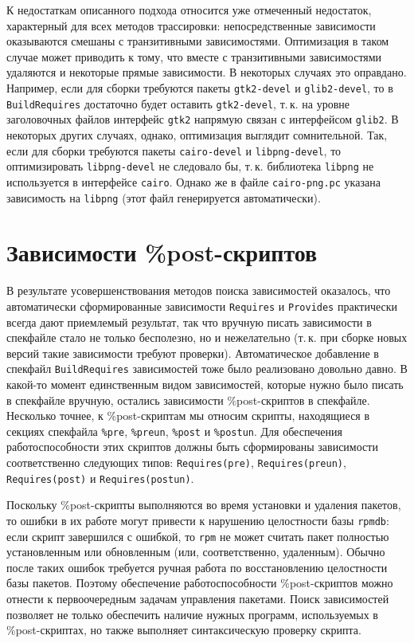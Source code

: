 \documentclass[russian,a4paper,12pt,titlepage]{article}
\begin{document}
К недостаткам описанного подхода относится уже отмеченный недостаток, характерный для всех методов трассировки:
непосредственные зависимости оказываются смешаны с транзитивными зависимостями.  Оптимизация в таком случае
может приводить к тому, что вместе с транзитивными зависимостями удаляются и некоторые прямые зависимости.
В некоторых случаях это оправдано.  Например, если для сборки требуются пакеты \verb|gtk2-devel| и
\verb|glib2-devel|, то в \verb|BuildRequires| достаточно будет оставить \verb|gtk2-devel|, т.\,к. на уровне
заголовочных файлов интерфейс \verb|gtk2| напрямую связан с интерфейсом \verb|glib2|.  В некоторых других случаях,
однако, оптимизация выглядит сомнительной.  Так, если для сборки требуются пакеты \verb|cairo-devel| и \verb|libpng-devel|,
то оптимизировать \verb|libpng-devel| не следовало бы, т.\,к. библиотека \verb|libpng| не используется в интерфейсе \verb|cairo|.
Однако же в файле \verb|cairo-png.pc| указана зависимость на \verb|libpng| (этот файл генерируется автоматически).

\section{Зависимости \%post-скриптов}
\label{post-script-deps}
В результате усовершенствования методов поиска зависимостей оказалось, что автоматически сформированные
зависимости \verb|Requires| и \verb|Provides| практически всегда дают приемлемый результат, так что вручную
писать зависимости в спекфайле стало не только бесполезно, но и нежелательно (т.\,к. при сборке новых версий
такие зависимости требуют проверки).  Автоматическое добавление в спекфайл \verb|BuildRequires| зависимостей
тоже было реализовано довольно давно.  В какой-то момент единственным видом зависимостей, которые нужно было
писать в спекфайле вручную, остались зависимости \%post-скриптов в спекфайле.  Несколько точнее, к \%post-скриптам
мы относим скрипты, находящиеся в секциях спекфайла \verb|%pre|, \verb|%preun|, \verb|%post| и \verb|%postun|.
Для обеспечения работоспособности этих скриптов должны быть сформированы зависимости соответственно следующих
типов: \verb|Requires(pre)|, \verb|Requires(preun)|, \verb|Requires(post)| и \verb|Requires(postun)|.

Поскольку \%post-скрипты выполняются во время установки и удаления пакетов, то ошибки в их работе
могут привести к нарушению целостности базы \verb|rpmdb|: если скрипт завершился с ошибкой, то
\verb|rpm| не может считать пакет полностью установленным или обновленным (или, соответственно, удаленным).
Обычно после таких ошибок требуется ручная работа по восстановлению целостности базы пакетов.
Поэтому обеспечение работоспособности \%post-скриптов можно отнести к первоочередным задачам управления пакетами.
Поиск зависимостей позволяет не только обеспечить наличие нужных программ, используемых в \%post-скриптах,
но также выполняет синтаксическую проверку скрипта.
\end{document}
